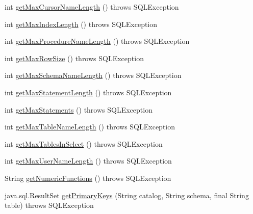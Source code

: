 \begin{DoxyCompactItemize}
int \mbox{\hyperlink{classcom_1_1mysql_1_1jdbc_1_1_database_meta_data_a6eb004c904b7e9bf4fbd9be126cc150a}{get\+Max\+Cursor\+Name\+Length}} ()  throws S\+Q\+L\+Exception 
\item 
int \mbox{\hyperlink{classcom_1_1mysql_1_1jdbc_1_1_database_meta_data_a005ab9a1c9fc029a8a4ccace4f84f99b}{get\+Max\+Index\+Length}} ()  throws S\+Q\+L\+Exception 
\item 
int \mbox{\hyperlink{classcom_1_1mysql_1_1jdbc_1_1_database_meta_data_a9513ea42bbfbc6f21532fef0c3b4b1be}{get\+Max\+Procedure\+Name\+Length}} ()  throws S\+Q\+L\+Exception 
\item 
int \mbox{\hyperlink{classcom_1_1mysql_1_1jdbc_1_1_database_meta_data_a60b474627e1d42d10c887873fce235ef}{get\+Max\+Row\+Size}} ()  throws S\+Q\+L\+Exception 
\item 
int \mbox{\hyperlink{classcom_1_1mysql_1_1jdbc_1_1_database_meta_data_a8951254ec4bb2224e3fd64e776b08f98}{get\+Max\+Schema\+Name\+Length}} ()  throws S\+Q\+L\+Exception 
\item 
int \mbox{\hyperlink{classcom_1_1mysql_1_1jdbc_1_1_database_meta_data_adbb5d3550d47bc03aa478386483853ba}{get\+Max\+Statement\+Length}} ()  throws S\+Q\+L\+Exception 
\item 
int \mbox{\hyperlink{classcom_1_1mysql_1_1jdbc_1_1_database_meta_data_a1ff21a2d6e3bf9439c03cf9d94c5c0c8}{get\+Max\+Statements}} ()  throws S\+Q\+L\+Exception 
\item 
int \mbox{\hyperlink{classcom_1_1mysql_1_1jdbc_1_1_database_meta_data_a97c772e9574b61a6273423641e829b0b}{get\+Max\+Table\+Name\+Length}} ()  throws S\+Q\+L\+Exception 
\item 
int \mbox{\hyperlink{classcom_1_1mysql_1_1jdbc_1_1_database_meta_data_a5ecdf1dfcc3a31428d0bc6ada467cf2d}{get\+Max\+Tables\+In\+Select}} ()  throws S\+Q\+L\+Exception 
\item 
int \mbox{\hyperlink{classcom_1_1mysql_1_1jdbc_1_1_database_meta_data_a6326960bc256397168656ab048a8a5b9}{get\+Max\+User\+Name\+Length}} ()  throws S\+Q\+L\+Exception 
\item 
String \mbox{\hyperlink{classcom_1_1mysql_1_1jdbc_1_1_database_meta_data_aa6ed04ec922adf87e5d0ce4a3dfe1fed}{get\+Numeric\+Functions}} ()  throws S\+Q\+L\+Exception 
\item 
java.\+sql.\+Result\+Set \mbox{\hyperlink{classcom_1_1mysql_1_1jdbc_1_1_database_meta_data_a46c186ab0bcdea0569100f0147339544}{get\+Primary\+Keys}} (String catalog, String schema, final String table)  throws S\+Q\+L\+Exception 
\item 

\end{DoxyCompactItemize}
